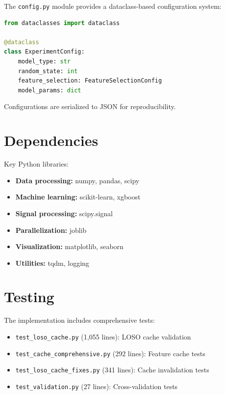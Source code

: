 The \texttt{config.py} module provides a dataclass-based configuration system:

\begin{lstlisting}[language=Python]
from dataclasses import dataclass

@dataclass
class ExperimentConfig:
    model_type: str
    random_state: int
    feature_selection: FeatureSelectionConfig
    model_params: dict
\end{lstlisting}

Configurations are serialized to JSON for reproducibility.

\section{Dependencies}
\label{sec:dependencies}

Key Python libraries:

\begin{itemize}
    \item \textbf{Data processing:} numpy, pandas, scipy
    \item \textbf{Machine learning:} scikit-learn, xgboost
    \item \textbf{Signal processing:} scipy.signal
    \item \textbf{Parallelization:} joblib
    \item \textbf{Visualization:} matplotlib, seaborn
    \item \textbf{Utilities:} tqdm, logging
\end{itemize}


\section{Testing}
\label{sec:testing}

The implementation includes comprehensive tests:

\begin{itemize}
    \item \texttt{test\_loso\_cache.py} (1,055 lines): LOSO cache validation
    \item \texttt{test\_cache\_comprehensive.py} (292 lines): Feature cache tests
    \item \texttt{test\_loso\_cache\_fixes.py} (341 lines): Cache invalidation tests
    \item \texttt{test\_validation.py} (27 lines): Cross-validation tests
\end{itemize}

